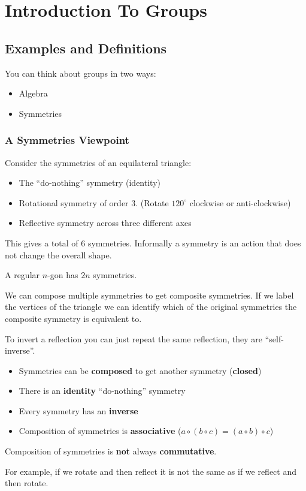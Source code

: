 \documentclass[../main.tex]{subfiles}
\begin{document}
\chapter{Introduction To Groups}
\section{Examples and Definitions}
You can think about groups in two ways:
\begin{itemize}
  \item Algebra
  \item Symmetries
\end{itemize}
\subsection{A Symmetries Viewpoint}
Consider the symmetries of an equilateral triangle:
\begin{itemize}
  \item The ``do-nothing'' symmetry (identity)
  \item Rotational symmetry of order 3. (Rotate $120^\circ$ clockwise or anti-clockwise)
  \item Reflective symmetry across three different axes
\end{itemize}
This gives a total of 6 symmetries.
Informally a symmetry is an action that does not change the overall shape.
\begin{remark}
  A regular $n$-gon has $2n$ symmetries.
\end{remark}
We can compose multiple symmetries to get composite symmetries.
If we label the vertices of the triangle we can identify which of the original symmetries the composite symmetry is equivalent to.

To invert a reflection you can just repeat the same reflection, they are ``self-inverse''.
\begin{remark}
  \begin{itemize}
    \item Symmetries can be \textbf{composed} to get another symmetry (\textbf{closed})
    \item There is an \textbf{identity} ``do-nothing'' symmetry
    \item Every symmetry has an \textbf{inverse}
    \item Composition of symmetries is \textbf{associative} ($a \circ (b \circ c) = (a \circ b) \circ c$)
  \end{itemize}
\end{remark}
\begin{remark}[Warning]
  Composition of symmetries is \textbf{not} always \textbf{commutative}.
  
  For example, if we rotate and then reflect it is not the same as if we reflect and then rotate.
\end{remark}
\end{document}

